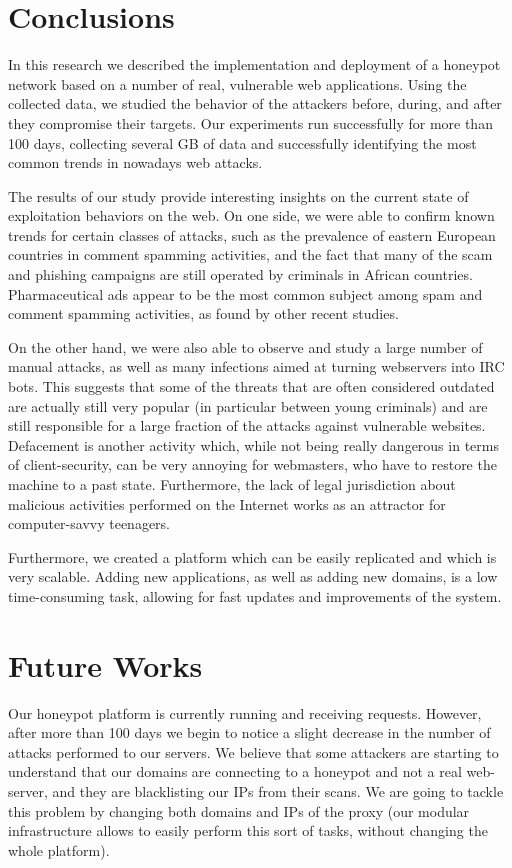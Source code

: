 \section{Conclusions}

In this research we described the implementation and deployment of a honeypot network based on a number of real, vulnerable web applications. Using the collected data, we studied the behavior of the attackers before, during, and after they compromise their targets. Our experiments run successfully for more than 100 days, collecting several GB of data and successfully identifying the most common trends in nowadays web attacks.

The results of our study provide interesting insights on the current state of exploitation behaviors on the web. On one side, we were able to confirm known trends for certain classes of attacks, such as the prevalence of eastern European countries in comment spamming activities, and the fact that many of the scam and phishing campaigns are still operated by criminals in African countries. Pharmaceutical ads appear to be the most common subject among spam and comment spamming activities, as found by other recent studies.

On the other hand, we were also able to observe and study a large number of manual attacks, as well as many infections aimed at turning webservers into IRC bots. This suggests that some of the threats that are often considered outdated are actually still very popular (in particular between young criminals) and are still responsible for a large fraction of the attacks against vulnerable websites. Defacement is another activity which, while not being really dangerous in terms of client-security, can be very annoying for webmasters, who have to restore the machine to a past state. Furthermore, the lack of legal jurisdiction about malicious activities performed on the Internet works as an attractor for computer-savvy teenagers.

Furthermore, we created a platform which can be easily replicated and which is very scalable. Adding new applications, as well as adding new domains, is a low time-consuming task, allowing for fast updates and improvements of the system.

\section{Future Works}

Our honeypot platform is currently running and receiving requests. However, after more than 100 days we begin to notice a slight decrease in the number of attacks performed to our servers. We believe that some attackers are starting to understand that our domains are connecting to a honeypot and not a real web-server, and they are blacklisting our IPs from their scans. We are going to tackle this problem by changing both domains and IPs of the proxy (our modular infrastructure allows to easily perform this sort of tasks, without changing the whole platform).

